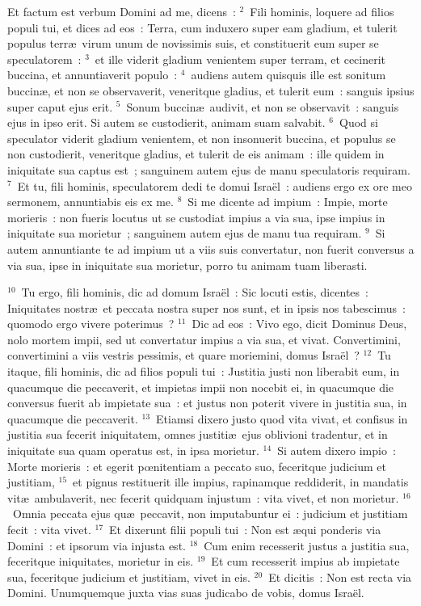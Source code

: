 \bchapter
\lettrine[lines=3,image=true,loversize=0.05,lraise=-0.03]{E}{}t factum est verbum Domini ad me, dicens~:
${}^{2}$~Fili hominis, loquere ad filios populi tui, et dices ad eos~: Terra, cum induxero super eam gladium, et tulerit populus terr\ae\ virum unum de novissimis suis, et constituerit eum super se speculatorem~:
${}^{3}$~et ille viderit gladium venientem super terram, et cecinerit buccina, et annuntiaverit populo~:
${}^{4}$~audiens autem quisquis ille est sonitum buccin\ae , et non se observaverit, veneritque gladius, et tulerit eum~: sanguis ipsius super caput ejus erit.
${}^{5}$~Sonum buccin\ae\ audivit, et non se observavit~: sanguis ejus in ipso erit. Si autem se custodierit, animam suam salvabit.
${}^{6}$~Quod si speculator viderit gladium venientem, et non insonuerit buccina, et populus se non custodierit, veneritque gladius, et tulerit de eis animam~: ille quidem in iniquitate sua captus est~; sanguinem autem ejus de manu speculatoris requiram.
${}^{7}$~Et tu, fili hominis, speculatorem dedi te domui Isra\"el~: audiens ergo ex ore meo sermonem, annuntiabis eis ex me.
${}^{8}$~Si me dicente ad impium~: Impie, morte morieris~: non fueris locutus ut se custodiat impius a via sua, ipse impius in iniquitate sua morietur~; sanguinem autem ejus de manu tua requiram.
${}^{9}$~Si autem annuntiante te ad impium ut a viis suis convertatur, non fuerit conversus a via sua, ipse in iniquitate sua morietur, porro tu animam tuam liberasti.


${}^{10}$~Tu ergo, fili hominis, dic ad domum Isra\"el~: Sic locuti estis, dicentes~: Iniquitates nostr\ae\ et peccata nostra super nos sunt, et in ipsis nos tabescimus~: quomodo ergo vivere poterimus~?
${}^{11}$~Dic ad eos~: Vivo ego, dicit Dominus Deus, nolo mortem impii, sed ut convertatur impius a via sua, et vivat. Convertimini, convertimini a viis vestris pessimis, et quare moriemini, domus Isra\"el~?
${}^{12}$~Tu itaque, fili hominis, dic ad filios populi tui~: Justitia justi non liberabit eum, in quacumque die peccaverit, et impietas impii non nocebit ei, in quacumque die conversus fuerit ab impietate sua~: et justus non poterit vivere in justitia sua, in quacumque die peccaverit.
${}^{13}$~Etiamsi dixero justo quod vita vivat, et confisus in justitia sua fecerit iniquitatem, omnes justiti\ae\ ejus oblivioni tradentur, et in iniquitate sua quam operatus est, in ipsa morietur.
${}^{14}$~Si autem dixero impio~: Morte morieris~: et egerit pœnitentiam a peccato suo, feceritque judicium et justitiam,
${}^{15}$~et pignus restituerit ille impius, rapinamque reddiderit, in mandatis vit\ae\ ambulaverit, nec fecerit quidquam injustum~: vita vivet, et non morietur.
${}^{16}$~Omnia peccata ejus qu\ae\ peccavit, non imputabuntur ei~: judicium et justitiam fecit~: vita vivet.
${}^{17}$~Et dixerunt filii populi tui~: Non est \ae qui ponderis via Domini~: et ipsorum via injusta est.
${}^{18}$~Cum enim recesserit justus a justitia sua, feceritque iniquitates, morietur in eis.
${}^{19}$~Et cum recesserit impius ab impietate sua, feceritque judicium et justitiam, vivet in eis.
${}^{20}$~Et dicitis~: Non est recta via Domini. Unumquemque juxta vias suas judicabo de vobis, domus Isra\"el.


